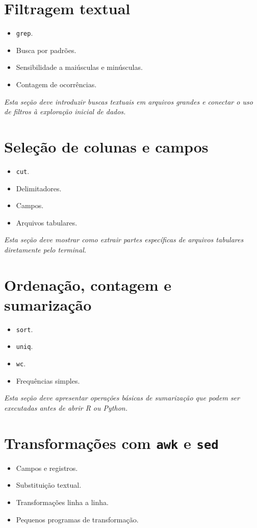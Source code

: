 \documentclass[12pt,openany]{book}
\newcommand{\placeholder}[1]{
    \par\medskip
    \noindent\textit{#1}
    \par\medskip
}
\newcommand{\topicos}[1]{
    \begin{itemize}
        #1
    \end{itemize}
}
\begin{document}
\begin{refsection}
\section{Filtragem textual}

\topicos{
    \item \texttt{grep}.
    \item Busca por padrões.
    \item Sensibilidade a maiúsculas e minúsculas.
    \item Contagem de ocorrências.
}

\placeholder{Esta seção deve introduzir buscas textuais em arquivos grandes e conectar o uso de filtros à exploração inicial de dados.}

\section{Seleção de colunas e campos}

\topicos{
    \item \texttt{cut}.
    \item Delimitadores.
    \item Campos.
    \item Arquivos tabulares.
}

\placeholder{Esta seção deve mostrar como extrair partes específicas de arquivos tabulares diretamente pelo terminal.}

\section{Ordenação, contagem e sumarização}

\topicos{
    \item \texttt{sort}.
    \item \texttt{uniq}.
    \item \texttt{wc}.
    \item Frequências simples.
}

\placeholder{Esta seção deve apresentar operações básicas de sumarização que podem ser executadas antes de abrir R ou Python.}

\section{Transformações com \texttt{awk} e \texttt{sed}}

\topicos{
    \item Campos e registros.
    \item Substituição textual.
    \item Transformações linha a linha.
    \item Pequenos programas de transformação.
}


\end{refsection}
\end{document}
